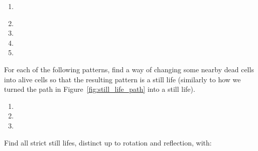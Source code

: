 \begin{multicols}{2}
\begin{problemstar}
\begin{multicols}{2}
\begin{enumerate}[label=(\alph*),series=exer_pseudo]
				\item[\bf\color{ocre}(c)] \\[1.0em]
				
				\item[\bf\color{ocre}(e)] 
				
				\item[\bf\color{ocre}(b)] 
				
				\item[\bf\color{ocre}(d)] 
				
				\item[\bf\color{ocre}(f)] 
			\end{enumerate}
		\end{multicols}
	\end{problemstar}
	
	
	\mfilbreak
	
	
	\begin{problemstar}\label{exer:still_life_add_dead} 
		For each of the following patterns, find a way of changing some nearby dead cells into alive cells so that the resulting pattern is a still life (similarly to how we turned the path in Figure~\ref{fig:still_life_path} into a still life).\vspace*{-0.25cm}
		
		\begin{multicols}{2}
			\begin{enumerate}
				\item[\bf\color{ocre}(a)] 
				
				\item[\bf\color{ocre}(c)] 
				
				\item[\bf\color{ocre}(b)] 
			\end{enumerate}
		\end{multicols}
	\end{problemstar}
	
	
	\mfilbreak
	
	
	\begin{problem}\label{exer:small_strict_still_lifes} 
		Find all strict still lifes, distinct up to rotation and reflection, with:\smallskip
		

\end{problem}
\end{multicols}
